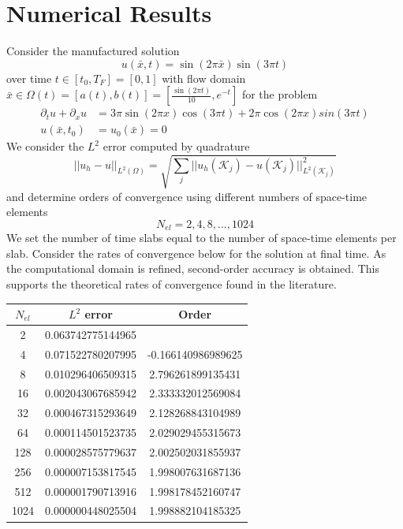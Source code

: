 \documentclass[11pt, oneside]{article}   	%
\begin{document}
\section{Numerical Results}
Consider the manufactured solution
\[ u(\bar{x},t) = \sin(2\pi \bar{x})\sin(3\pi t) \]
over time $t \in [t_0,T_F] = [0,1]$ with flow domain $\bar{x} \in \Omega(t) = [a(t), b(t)]  = [\frac{\sin(2\pi t)}{10}, e^{-t}]$ for the problem
\[\begin{split}
\partial_t u + \partial_x u &= 3\pi\sin(2\pi x)\cos(3\pi t) + 2\pi\cos(2\pi x)sin(3\pi t)\\
u(\bar{x}, t_0) &= u_{0}(\bar{x}) = 0
\end{split}\]
We consider the $L^2$ error computed by quadrature
\[ ||u_h - u||_{L^2(\Omega)} = \sqrt{\sum_j ||u_h(\mathcal{K}_j) - u(\mathcal{K}_j)||_{L^2(\mathcal{K}_j)}^{2}} \]
and determine orders of convergence using different numbers of space-time elements
\[ N_{el} = 2,4,8,...,1024 \]
We set the number of time slabs equal to the number of space-time elements per slab.
Consider the rates of convergence below for the solution at final time.
As the computational domain is refined, second-order accuracy is obtained.
This supports the theoretical rates of convergence found in the literature.
\begin{center}
\begin{tabular}{|c|c|c|}
\hline
$N_{el}$ & $L^2$ error & Order\\
\hline
2		& 0.063742775144965 & \\
4		& 0.071522780207995 & -0.166140986989625\\
8 		& 0.010296406509315 & 2.796261899135431\\
16 		& 0.002043067685942 & 2.333332012569084\\
32 		& 0.000467315293649 & 2.128268843104989\\
64 		& 0.000114501523735 & 2.029029455315673\\
128 		& 0.000028575779637 & 2.002502031855937\\
256 		& 0.000007153817545 & 1.998007631687136\\
512 		& 0.000001790713916 & 1.998178452160747\\
1024 	& 0.000000448025504 & 1.998882104185325\\
\hline
\end{tabular}
\end{center}
\end{document}
